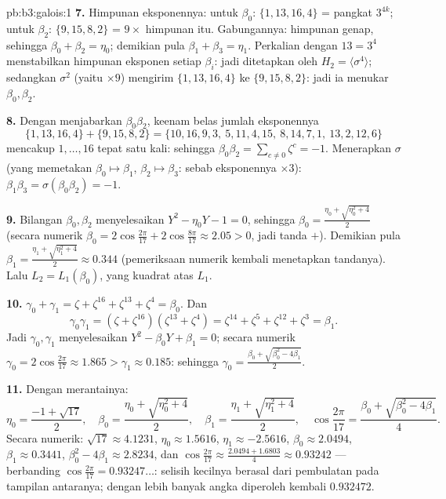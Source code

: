 \begin{solution}{pb:b3:galois:1}
\textbf{7.} Himpunan eksponennya: untuk $\beta_0$: $\{1, 13, 16, 4\}$ =
pangkat $3^{4k}$; untuk $\beta_2$: $\{9, 15, 8, 2\}$ = $9 \times$ himpunan
itu. Gabungannya: himpunan genap, sehingga $\beta_0 + \beta_2 = \eta_0$; demikian pula
$\beta_1 + \beta_3 = \eta_1$. Perkalian dengan $13 = 3^4$
menstabilkan himpunan eksponen setiap $\beta_i$: jadi ditetapkan oleh $H_2 =
\langle\sigma^4\rangle$; sedangkan $\sigma^2$ (yaitu $\times 9$) mengirim
$\{1,13,16,4\}$ ke $\{9, 15, 8, 2\}$: jadi ia menukar $\beta_0,
\beta_2$.

\textbf{8.} Dengan menjabarkan $\beta_0\beta_2$, keenam belas jumlah
eksponennya
\[
\{1,13,16,4\} + \{9,15,8,2\} =
\{10,16,9,3,\ 5,11,4,15,\ 8,14,7,1,\ 13,2,12,6\}
\]
mencakup $1, \dots, 16$ tepat satu kali: sehingga $\beta_0\beta_2 =
\sum_{c\ne0}\zeta^c = -1$. Menerapkan $\sigma$ (yang memetakan
$\beta_0 \mapsto \beta_1$, $\beta_2 \mapsto \beta_3$: sebab
eksponennya $\times 3$): $\beta_1\beta_3 = \sigma(\beta_0\beta_2)
= -1$.

\textbf{9.} Bilangan $\beta_0, \beta_2$ menyelesaikan $Y^2 - \eta_0 Y - 1 = 0$,
sehingga $\beta_0 = \frac{\eta_0 + \sqrt{\eta_0^2 + 4}}2$ (secara numerik
$\beta_0 = 2\cos\frac{2\pi}{17} + 2\cos\frac{8\pi}{17} \approx
2.05 > 0$, jadi tanda $+$). Demikian pula $\beta_1 = \frac{\eta_1 +
\sqrt{\eta_1^2 + 4}}2 \approx 0.344$ (pemeriksaan numerik kembali menetapkan
tandanya). Lalu $L_2 = L_1(\beta_0)$, yang kuadrat atas $L_1$.

\textbf{10.} $\gamma_0 + \gamma_1 = \zeta + \zeta^{16} +
\zeta^{13} + \zeta^4 = \beta_0$. Dan
\[
\gamma_0\gamma_1 = (\zeta + \zeta^{16})(\zeta^{13} + \zeta^4)
= \zeta^{14} + \zeta^{5} + \zeta^{12} + \zeta^{3} = \beta_1 .
\]
Jadi $\gamma_0, \gamma_1$ menyelesaikan $Y^2 - \beta_0Y + \beta_1 = 0$;
secara numerik $\gamma_0 = 2\cos\frac{2\pi}{17} \approx 1.865 >
\gamma_1 \approx 0.185$: sehingga $\gamma_0 = \frac{\beta_0 +
\sqrt{\beta_0^2 - 4\beta_1}}2$.

\textbf{11.} Dengan merantainya:
\[
\eta_0 = \frac{-1 + \sqrt{17}}2,
\quad
\beta_0 = \frac{\eta_0 + \sqrt{\eta_0^2 + 4}}2,
\quad
\beta_1 = \frac{\eta_1 + \sqrt{\eta_1^2 + 4}}2,
\quad
\cos\frac{2\pi}{17} = \frac{\beta_0 + \sqrt{\beta_0^2 -
4\beta_1}}4 .
\]
Secara numerik: $\sqrt{17} \approx 4.1231$, $\eta_0 \approx
1.5616$, $\eta_1 \approx -2.5616$, $\beta_0 \approx 2.0494$,
$\beta_1 \approx 0.3441$, $\beta_0^2 - 4\beta_1 \approx
2.8234$, dan $\cos\frac{2\pi}{17} \approx \frac{2.0494 +
1.6803}4 \approx 0.93242$ --- berbanding $\cos\frac{2\pi}{17} =
0.93247\dots$: selisih kecilnya berasal dari pembulatan pada
tampilan antaranya; dengan lebih banyak angka diperoleh kembali
$0.932472$.


\end{solution}
